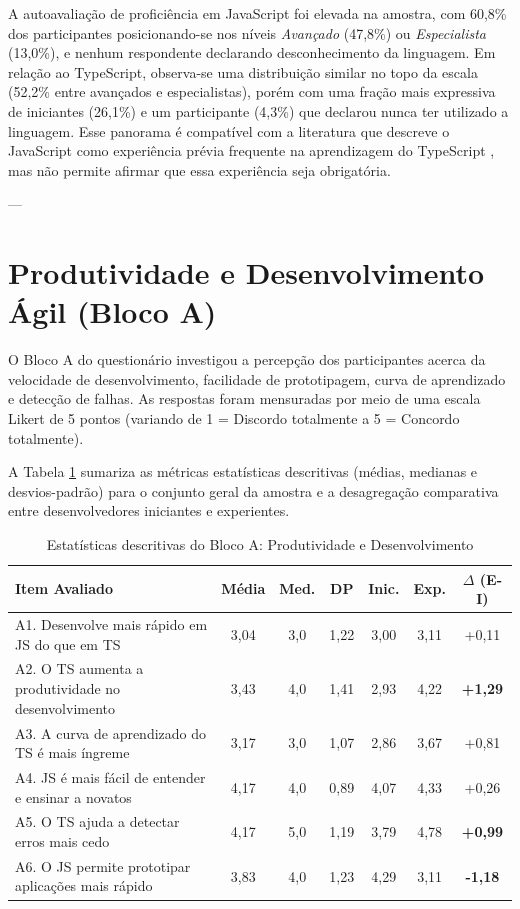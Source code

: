 A autoavaliação de proficiência em JavaScript foi elevada na amostra, com 60,8\% dos participantes posicionando-se nos níveis \textit{Avançado} (47,8\%) ou \textit{Especialista} (13,0\%), e nenhum respondente declarando desconhecimento da linguagem. Em relação ao TypeScript, observa-se uma distribuição similar no topo da escala (52,2\% entre avançados e especialistas), porém com uma fração mais expressiva de iniciantes (26,1\%) e um participante (4,3\%) que declarou nunca ter utilizado a linguagem. Esse panorama é compatível com a literatura que descreve o JavaScript como experiência prévia frequente na aprendizagem do TypeScript \cite{mororo2024}, mas não permite afirmar que essa experiência seja obrigatória.

---

\section{Produtividade e Desenvolvimento Ágil (Bloco A)}
\label{sec:produtividade}

O Bloco A do questionário investigou a percepção dos participantes acerca da velocidade de desenvolvimento, facilidade de prototipagem, curva de aprendizado e detecção de falhas. As respostas foram mensuradas por meio de uma escala Likert de 5 pontos (variando de 1 = Discordo totalmente a 5 = Concordo totalmente).

A Tabela \ref{tab:blocoA} sumariza as métricas estatísticas descritivas (médias, medianas e desvios-padrão) para o conjunto geral da amostra e a desagregação comparativa entre desenvolvedores iniciantes e experientes.

\begin{table}[H]
\centering
\caption{Estatísticas descritivas do Bloco A: Produtividade e Desenvolvimento}
\label{tab:blocoA}
\small
\begin{tabular}{|p{7.5cm}|c|c|c|c|c|c|}
\hline
\rowcolor{gray!20}
\textbf{Item Avaliado} & \textbf{Média} & \textbf{Med.} & \textbf{DP} & \textbf{Inic.} & \textbf{Exp.} & \textbf{$\Delta$ (E-I)} \\
\hline
A1. Desenvolve mais rápido em JS do que em TS & 3,04 & 3,0 & 1,22 & 3,00 & 3,11 & +0,11 \\
\hline
A2. O TS aumenta a produtividade no desenvolvimento & 3,43 & 4,0 & 1,41 & 2,93 & 4,22 & \textbf{+1,29} \\
\hline
A3. A curva de aprendizado do TS é mais íngreme & 3,17 & 3,0 & 1,07 & 2,86 & 3,67 & +0,81 \\
\hline
A4. JS é mais fácil de entender e ensinar a novatos & 4,17 & 4,0 & 0,89 & 4,07 & 4,33 & +0,26 \\
\hline
A5. O TS ajuda a detectar erros mais cedo & 4,17 & 5,0 & 1,19 & 3,79 & 4,78 & \textbf{+0,99} \\
\hline
A6. O JS permite prototipar aplicações mais rápido & 3,83 & 4,0 & 1,23 & 4,29 & 3,11 & \textbf{-1,18} \\
\hline
\end{tabular}
\vspace{0.1cm}

\end{table}

